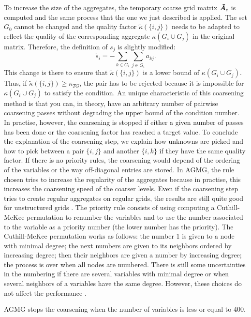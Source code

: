 To increase the size of the aggregates, the temporary coarse grid matrix
$\boldsymbol{\tilde{A}}_c$ is computed and the same process that the one we just
described is applied. The set $G_0$ cannot be changed and the quality factor
$\tilde{\kappa}(\{i,j\})$ needs to be adapted to reflect the quality of the
corresponding aggregate $\kappa(G_i\cup G_j)$ in the original matrix.
Therefore, the definition of $s_j$ is slightly modified:
\begin{equation}
  \tilde{s}_i = - \sum_{k \in G_i} \sum_{j \in G_i} a_{kj}.
\end{equation}
This change is there to ensure that $\tilde{\kappa}(\{i,j\})$ is a lower
bound of $\kappa(G_i \cup G_j)$. Thus, if $\tilde{\kappa}(\{i,j\}) \geq
\bar{\kappa}_{TG}$, the pair has to be rejected because it is impossible for
$\kappa(G_i \cup G_j)$ to satisfy the condition. An unique characteristic 
of this coarsening method is that you can, in theory, have an 
arbitrary number of pairwise coarsening passes without degrading the upper
bound of the condition number. In practise, however, the coarsening is
stopped if either a given number of passes has been done or the coarsening
factor has reached a target value. To conclude the explanation of the
coarsening step, we explain how unknowns are picked and how to pick between 
a pair $\{i,j\}$ and another $\{i,k\}$ if they have the same quality factor. 
If there is no priority rules, the coarsening would depend of the ordering 
of the variables or the way off-diagonal entries are stored. In AGMG, the 
rule chosen tries to increase the regularity of the aggregates because in 
practise, this increases the coarsening speed of the coarser levels. Even 
if the coarsening step tries to create regular aggregates on regular grids, 
the results are still quite good for unstructured grids \cite{agmg2}. The 
priority rule consists of using computing a Cuthill-McKee permutation 
\cite{cmk} to renumber the variables and to use the number associated to the 
variable as a priority number (the lower number has the priority). The 
Cuthill-McKee permutation works as follows: the number 1 is given to a node 
with minimal degree; the next numbers are given to its neighbors ordered by
increasing degree; then their neighbors are given a number by
increasing degree; the process is over when all nodes are numbered. There is
still some uncertainties in the numbering if there are several variables
with minimal degree or when several neighbors of a variables have the same
degree. However, these choices do not affect the
performance \cite{agmg2}. 

AGMG stops the coarsening when the number of variables is less or equal to
400.
